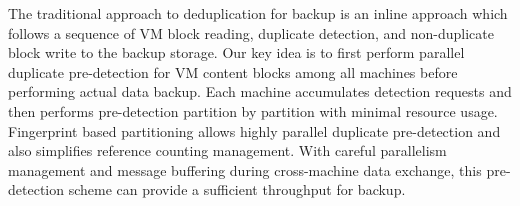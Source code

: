 The traditional approach to  deduplication for backup is an inline approach which follows
a sequence of VM block reading, duplicate detection,  and non-duplicate  block write to the 
backup storage.  
Our key idea  is to  first perform parallel duplicate pre-detection for VM content blocks 
among all machines before performing actual data backup. Each machine
accumulates detection requests and  then performs pre-detection   partition by partition 
with minimal resource usage.
Fingerprint based partitioning allows highly parallel duplicate pre-detection  and also simplifies 
reference counting management.  
With careful parallelism management and message buffering during cross-machine data exchange,
this pre-detection scheme can provide  a sufficient throughput for backup.   











